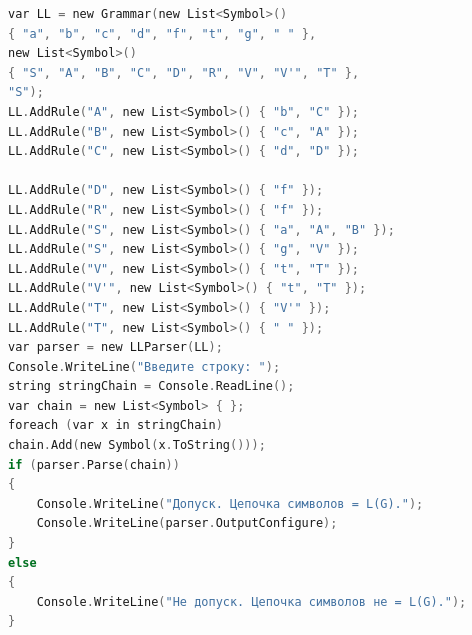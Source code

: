 \documentclass[12pt]{extarticle}
\begin{document}
	\begin{lstlisting}[language=C]
var LL = new Grammar(new List<Symbol>() 
{ "a", "b", "c", "d", "f", "t", "g", " " },
new List<Symbol>()
{ "S", "A", "B", "C", "D", "R", "V", "V'", "T" },
"S");
LL.AddRule("A", new List<Symbol>() { "b", "C" });
LL.AddRule("B", new List<Symbol>() { "c", "A" });
LL.AddRule("C", new List<Symbol>() { "d", "D" });

LL.AddRule("D", new List<Symbol>() { "f" });
LL.AddRule("R", new List<Symbol>() { "f" });
LL.AddRule("S", new List<Symbol>() { "a", "A", "B" });
LL.AddRule("S", new List<Symbol>() { "g", "V" });
LL.AddRule("V", new List<Symbol>() { "t", "T" });
LL.AddRule("V'", new List<Symbol>() { "t", "T" });
LL.AddRule("T", new List<Symbol>() { "V'" });
LL.AddRule("T", new List<Symbol>() { " " });
var parser = new LLParser(LL);
Console.WriteLine("Введите строку: ");
string stringChain = Console.ReadLine();
var chain = new List<Symbol> { };
foreach (var x in stringChain)
chain.Add(new Symbol(x.ToString()));
if (parser.Parse(chain))
{
	Console.WriteLine("Допуск. Цепочка символов = L(G).");
	Console.WriteLine(parser.OutputConfigure);
}
else
{
	Console.WriteLine("Не допуск. Цепочка символов не = L(G).");
}
	\end{lstlisting}
	
\end{document}
